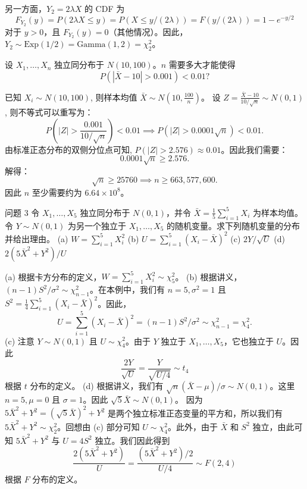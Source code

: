 \begin{questions}
\begin{solution}
另一方面，$Y_2 = 2\lambda X$ 的 CDF 为
\[
F_{Y_2}(y) = P(2\lambda X \le y) = P(X \le y/(2\lambda)) = F(y/(2\lambda)) = 1 - e^{-y/2}
\]
对于 $y > 0$，且 $F_{Y_2}(y) = 0$（其他情况）。因此，$Y_2 \sim \text{Exp}(1/2) = \text{Gamma}(1, 2) = \chi_2^2$。
\end{solution}

\question
设 $X_1, \dots, X_n$ 独立同分布于 $N(10, 100)$。$n$ 需要多大才能使得
\[
P(|\bar{X} - 10| > 0.001) < 0.01?
\]

\begin{solution}
已知 $X_i \sim N(10, 100)$, 则样本均值 $\bar{X} \sim N\left( 10, \frac{100}{n} \right)$。
设 $Z = \frac{\bar{X} - 10}{10/\sqrt{n}} \sim N(0, 1)$, 则不等式可以重写为：
\[
P\left( |Z| > \frac{0.001}{10/\sqrt{n}} \right) < 0.01 \implies P\left( |Z| > 0.0001\sqrt{n} \right) < 0.01.
\]
由标准正态分布的双侧分位点可知, $P(|Z| > 2.576) \approx 0.01$。因此我们需要：
\[
0.0001\sqrt{n} \ge 2.576.
\]
解得：
\[
\sqrt{n} \ge 25760 \implies n \ge 663,577,600.
\]
因此 $n$ 至少需要约为 $6.64 \times 10^8$。
\end{solution}

\question 问题 3 令 $X_1, \dots, X_5$ 独立同分布于 $N(0, 1)$，并令 $\bar{X} = \frac{1}{5} \sum_{i=1}^5 X_i$ 为样本均值。令 $Y \sim N(0, 1)$ 为另一个独立于 $X_1, \dots, X_5$ 的随机变量。求下列随机变量的分布并给出理由。
(a) $W = \sum_{i=1}^5 X_i^2$
(b) $U = \sum_{i=1}^5 (X_i - \bar{X})^2$
(c) $2Y/\sqrt{U}$
(d) $2(5\bar{X}^2 + Y^2)/U$

\begin{solution}
(a) 根据卡方分布的定义，$W = \sum_{i=1}^5 X_i^2 \sim \chi_5^2$。
(b) 根据讲义，$(n-1)S^2/\sigma^2 \sim \chi_{n-1}^2$。在本例中，我们有 $n = 5, \sigma^2 = 1$ 且 $S^2 = \frac{1}{4} \sum_{i=1}^5 (X_i - \bar{X})^2$。因此，
\[
U = \sum_{i=1}^5 (X_i - \bar{X})^2 = (n-1)S^2/\sigma^2 \sim \chi_{n-1}^2 = \chi_4^2.
\]
(c) 注意 $Y \sim N(0, 1)$ 且 $U \sim \chi_4^2$。由于 $Y$ 独立于 $X_1, \dots, X_5$，它也独立于 $U$。因此
\[
\frac{2Y}{\sqrt{U}} = \frac{Y}{\sqrt{U/4}} \sim t_4
\]
根据 $t$ 分布的定义。
(d) 根据讲义，我们有 $\sqrt{n}(\bar{X} - \mu)/\sigma \sim N(0, 1)$。这里 $n = 5, \mu = 0$ 且 $\sigma = 1$。因此 $\sqrt{5}\bar{X} \sim N(0, 1)$。
因为 $5\bar{X}^2 + Y^2 = (\sqrt{5}\bar{X})^2 + Y^2$ 是两个独立标准正态变量的平方和，所以我们有 $5\bar{X}^2 + Y^2 \sim \chi_2^2$。回想由 (c) 部分可知 $U \sim \chi_4^2$。此外，由于 $\bar{X}$ 和 $S^2$ 独立，由此可知 $5\bar{X}^2 + Y^2$ 与 $U = 4S^2$ 独立。我们因此得到
\[
\frac{2(5\bar{X}^2 + Y^2)}{U} = \frac{(5\bar{X}^2 + Y^2)/2}{U/4} \sim F(2, 4)
\]
根据 $F$ 分布的定义。
\end{solution}


\end{questions}
